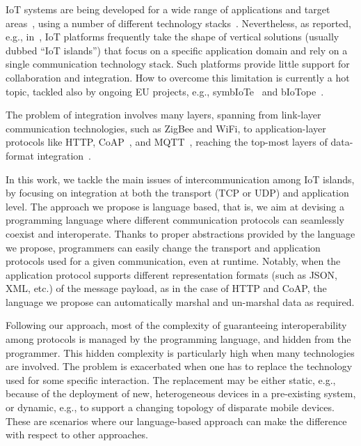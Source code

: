 IoT systems are being developed for a wide range of applications and target
areas~\cite{GubbiBMP13,Atzori20102787}, using a number of different technology stacks~\cite{7123563}.
%
Nevertheless, as reported, e.g., in~\cite{Soursos16,Gojmerac16}, IoT
platforms frequently take the shape of vertical solutions (usually
dubbed ``IoT islands'') that focus on a specific application domain
and rely on a single communication technology stack. Such platforms
provide little support for collaboration and integration. How to
overcome this limitation is currently a hot topic, tackled also by
ongoing EU projects, e.g., symbIoTe~\cite{Gojmerac16} and
bIoTope~\cite{biotope}.

The problem of integration involves many layers, spanning from link-layer
communication technologies, such as ZigBee and WiFi, to application-layer
protocols like HTTP, CoAP~\cite{coap,doi:10.17487/RFC7252}, and
MQTT~\cite{mqtt,mqtt-v3.1.1}, reaching the top-most layers of data-format
integration~\cite{Milenkovic:2015:CII:2843962.2822643}.

In this work, we tackle the main issues of intercommunication among
IoT islands, by focusing on integration at both the transport (TCP or
UDP) and application level. The approach we propose is language based,
that is, we aim at devising a programming language where different
communication protocols can seamlessly coexist and
interoperate. Thanks to proper abstractions provided by the language we
propose, programmers can easily change the transport and application
protocols used for a given communication, even at runtime.
%
Notably, when the application protocol supports different representation formats
(such as JSON, XML, etc.) of the message payload, as in the case of HTTP and
CoAP, the language we propose can automatically marshal and un-marshal data as
required.

Following our approach, most of the complexity of guaranteeing interoperability
among protocols is managed by the programming language, and hidden from the
programmer. This hidden complexity is particularly high when many technologies
are involved. The problem is exacerbated when one has to replace the technology
used for some specific interaction. The replacement may be either static, e.g.,
because of the deployment of new, heterogeneous devices in a pre-existing
system, or dynamic, e.g., to support a changing topology of disparate mobile
devices. These are scenarios where our language-based approach can make the
difference with respect to other approaches.

